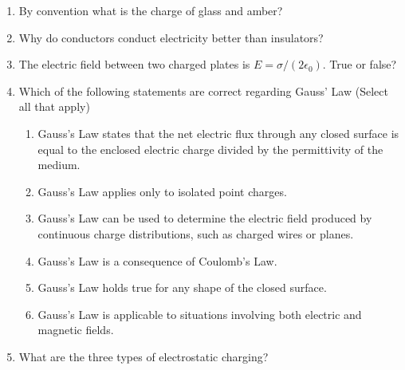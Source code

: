 \newcommand{\NoteType}{Assignment 1}
\newcommand{\CourseName}{Electromagnetism \& Electronics}
\newcommand{\CourseNumber}{290231U007}


  
  \newpage

  \begin{quiz}
    \begin{enumerate}
      \item By convention what is the charge of glass and amber?
      \item Why do conductors conduct electricity better than insulators?
      \item The electric field between two charged plates is $E = \sigma / (2 \epsilon_0)$.
        True or false?
      \item Which of the following statements are correct regarding Gauss' Law (Select all that apply)
        \begin{enumerate}
          \item Gauss's Law states that the net electric flux through any closed surface is equal to the enclosed electric charge divided by the permittivity of the medium.
          \item Gauss's Law applies only to isolated point charges.
          \item Gauss's Law can be used to determine the electric field produced by continuous charge distributions, such as charged wires or planes.
          \item Gauss's Law is a consequence of Coulomb's Law.
          \item Gauss's Law holds true for any shape of the closed surface.
          \item Gauss's Law is applicable to situations involving both electric and magnetic fields.
        \end{enumerate}
      \item What are the three types of electrostatic charging?
    \end{enumerate}
  \end{quiz}

